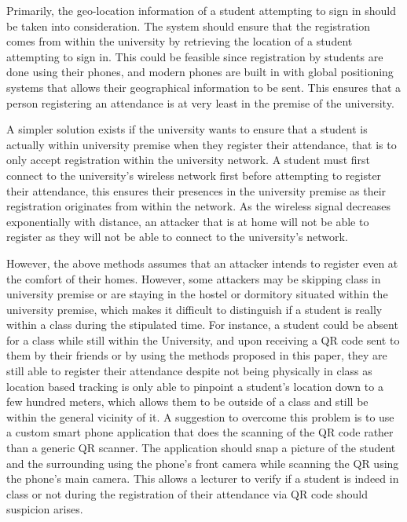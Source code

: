 \documentclass[runningheads]{llncs}
\begin{document}
Primarily, the geo-location information of a student attempting to sign in should be taken into consideration. The system should ensure that the registration comes from within the university by retrieving the location of a student attempting to sign in. This could be feasible since registration by students are done using their phones, and modern phones are built in with global positioning systems that allows their geographical information to be sent. This ensures that a person registering an attendance is at very least in the premise of the university. 

A simpler solution exists if the university wants to ensure that a student is actually within university premise when they register their attendance, that is to only accept registration within the university network. A student must first connect to the university's wireless network first before attempting to register their attendance, this ensures their presences in the university premise as their registration originates from within the network. As the wireless signal decreases exponentially with distance, an attacker that is at home will not be able to register as they will not be able to connect to the university's network.

However, the above methods assumes that an attacker intends to register even at the comfort of their homes. However, some attackers may be skipping class in university premise or are staying in the hostel or dormitory situated within the university premise, which makes it difficult to distinguish if a student is really within a class during the stipulated time. For instance, a student could be absent for a class while still within the University, and upon receiving a QR code sent to them by their friends or by using the methods proposed in this paper, they are still able to register their attendance despite not being physically in class as location based tracking is only able to pinpoint a student's location down to a few hundred meters, which allows them to be outside of a class and still be within the general vicinity of it. A suggestion to overcome this problem is to use a custom smart phone application that does the scanning of the QR code rather than a generic QR scanner. The application should snap a picture of the student and the surrounding using the phone's front camera while scanning the QR using the phone's main camera. This allows a lecturer to verify if a student is indeed in class or not during the registration of their attendance via QR code should suspicion arises.
\end{document}
